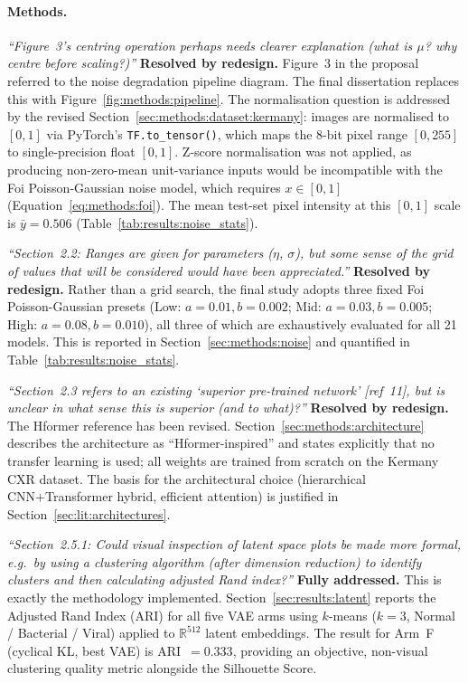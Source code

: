 \documentclass[12pt, a4paper, twoside, openright]{book}
\begin{document}
\begin{appendices}
\paragraph{Methods.}
\textit{``Figure~3's centring operation perhaps needs clearer explanation (what is $\mu$? why centre before scaling?)''}
\textbf{Resolved by redesign.} Figure~3 in the proposal referred to the noise degradation pipeline diagram. The final dissertation replaces this with Figure~\ref{fig:methods:pipeline}. The normalisation question is addressed by the revised Section~\ref{sec:methods:dataset:kermany}: images are normalised to $[0,1]$ via PyTorch's \texttt{TF.to\_tensor()}, which maps the 8-bit pixel range $[0,255]$ to single-precision float $[0,1]$. Z-score normalisation was not applied, as producing non-zero-mean unit-variance inputs would be incompatible with the Foi Poisson-Gaussian noise model, which requires $x \in [0,1]$ (Equation~\ref{eq:methods:foi}). The mean test-set pixel intensity at this $[0,1]$ scale is $\bar{y} = 0.506$ (Table~\ref{tab:results:noise_stats}).

\textit{``Section~2.2: Ranges are given for parameters ($\eta$, $\sigma$), but some sense of the grid of values that will be considered would have been appreciated.''}
\textbf{Resolved by redesign.} Rather than a grid search, the final study adopts three fixed Foi Poisson-Gaussian presets (Low: $a=0.01, b=0.002$; Mid: $a=0.03, b=0.005$; High: $a=0.08, b=0.010$), all three of which are exhaustively evaluated for all 21 models. This is reported in Section~\ref{sec:methods:noise} and quantified in Table~\ref{tab:results:noise_stats}.

\textit{``Section~2.3 refers to an existing `superior pre-trained network' [ref~11], but is unclear in what sense this is superior (and to what)?''}
\textbf{Resolved by redesign.} The Hformer reference has been revised. Section~\ref{sec:methods:architecture} describes the architecture as ``Hformer-inspired'' and states explicitly that no transfer learning is used; all weights are trained from scratch on the Kermany CXR dataset. The basis for the architectural choice (hierarchical CNN+Transformer hybrid, efficient attention) is justified in Section~\ref{sec:lit:architectures}.

\textit{``Section~2.5.1: Could visual inspection of latent space plots be made more formal, e.g.\ by using a clustering algorithm (after dimension reduction) to identify clusters and then calculating adjusted Rand index?''}
\textbf{Fully addressed.} This is exactly the methodology implemented. Section~\ref{sec:results:latent} reports the Adjusted Rand Index (ARI) for all five VAE arms using $k$-means ($k=3$, Normal / Bacterial / Viral) applied to $\mathbb{R}^{512}$ latent embeddings. The result for Arm~F (cyclical KL, best VAE) is ARI~$=0.333$, providing an objective, non-visual clustering quality metric alongside the Silhouette Score.


\end{appendices}
\end{document}

